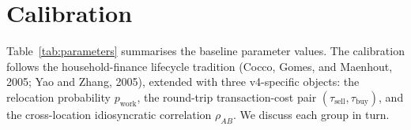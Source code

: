 %
%
%

\section{Calibration}
\label{sec:calibration}

Table~\ref{tab:parameters} summarises the baseline parameter values.
The calibration follows the household-finance lifecycle tradition
(Cocco, Gomes, and Maenhout, 2005; Yao and Zhang, 2005), extended
with three v4-specific objects: the relocation probability $p_{\text{work}}$,
the round-trip transaction-cost pair $(\tau_{\text{sell}}, \tau_{\text{buy}})$,
and the cross-location idiosyncratic correlation $\rho_{AB}$.
We discuss each group in turn.

